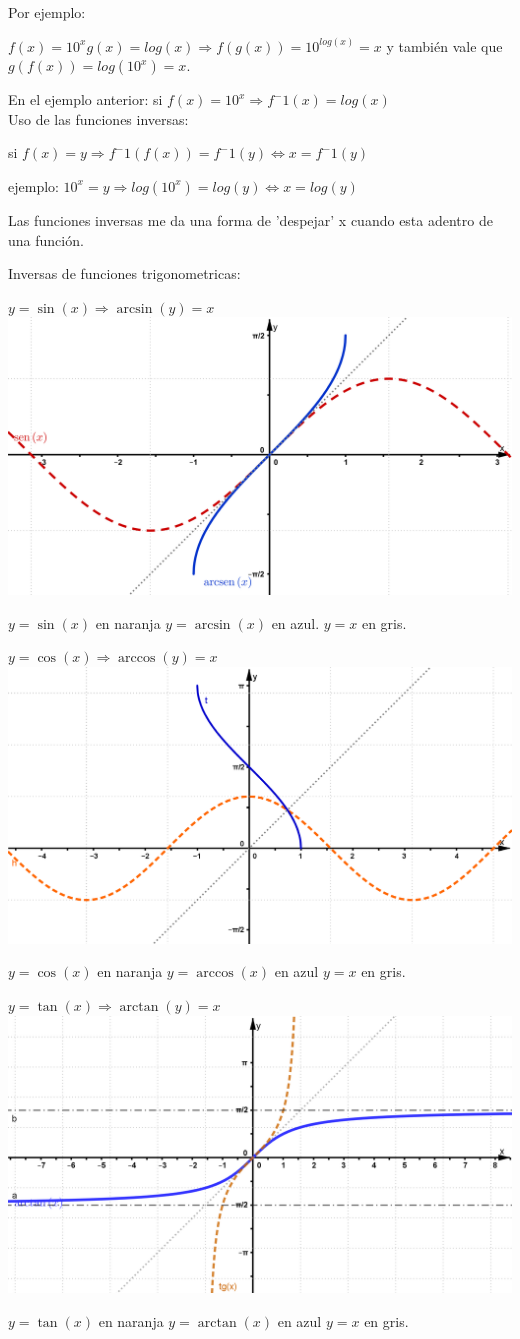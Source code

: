 \documentclass[a4paper,11pt,spanish,sans]{exam}
\begin{document}
Por ejemplo: 

$f(x)= 10^x

g(x)= log(x)

\Rightarrow  f(g(x))= 10^{log(x)}=x    $ y también vale que $g(f(x))=log(10^x)=x$.

En el ejemplo anterior: si $f(x)= 10^x  \Rightarrow f^-1(x)= log(x)$\\

Uso de las funciones inversas: 

si $f(x)=y \Rightarrow f^-1(f(x))=f^-1(y) \Leftrightarrow x=f^-1(y)$

ejemplo: $10^x=y \Rightarrow log(10^x)=log(y) \Leftrightarrow x=log(y)$

Las funciones inversas me da una forma de 'despejar' x cuando esta adentro de una función.

Inversas de funciones trigonometricas: 



$y=\sin (x) \Rightarrow \arcsin(y)=x $  \includegraphics[width=0.5\linewidth]{arcsen.png}
\caption{$y=\sin (x) $ en naranja $y=\arcsin(x)$ en azul. $y=x$ en gris.}

$y=\cos (x) \Rightarrow \arccos(y)=x $  \includegraphics[width=0.5\linewidth]{arccos.png}
\caption{$y=\cos (x) $ en naranja $y=\arccos(x)$ en azul $y=x$ en gris.}

$y=\tan(x) \Rightarrow \arctan(y)=x $  \includegraphics[width=0.5\linewidth]{arctan.png}
\caption{$y=\tan (x) $ en naranja $y=\arctan(x)$ en azul $y=x$ en gris.}
\end{document}
